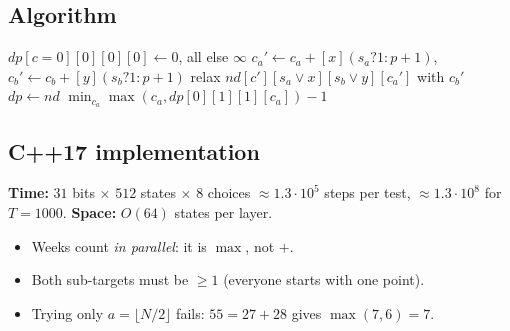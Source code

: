 \subsection*{Algorithm}
\begin{algorithmic}[1]
\State $dp[c=0][0][0][0]\gets0$, all else $\infty$
    \State $c_a'\gets c_a+[x](s_a?1:p+1)$, $c_b'\gets c_b+[y](s_b?1:p+1)$
    \State relax $nd[c'][s_a\lor x][s_b\lor y][c_a']$ with $c_b'$
  \EndFor
  \State $dp\gets nd$
\EndFor
\State \Return $\min_{c_a}\max(c_a,dp[0][1][1][c_a])-1$
\end{algorithmic}


\subsection*{C++17 implementation}

\begin{complexitybox}
\textbf{Time:} $31$ bits $\times$ $512$ states $\times$ $8$ choices
$\approx1.3\cdot10^5$ steps per test, $\approx1.3\cdot10^8$ for $T=1000$.
\textbf{Space:} $O(64)$ states per layer.
\end{complexitybox}

\begin{pitfallbox}
\begin{itemize}
  \item Weeks count \emph{in parallel}: it is $\max$, not $+$.
  \item Both sub-targets must be $\ge1$ (everyone starts with one point).
  \item Trying only $a=\lfloor N/2\rfloor$ fails: $55=27+28$ gives
        $\max(7,6)=7$.
\end{itemize}
\end{pitfallbox}
